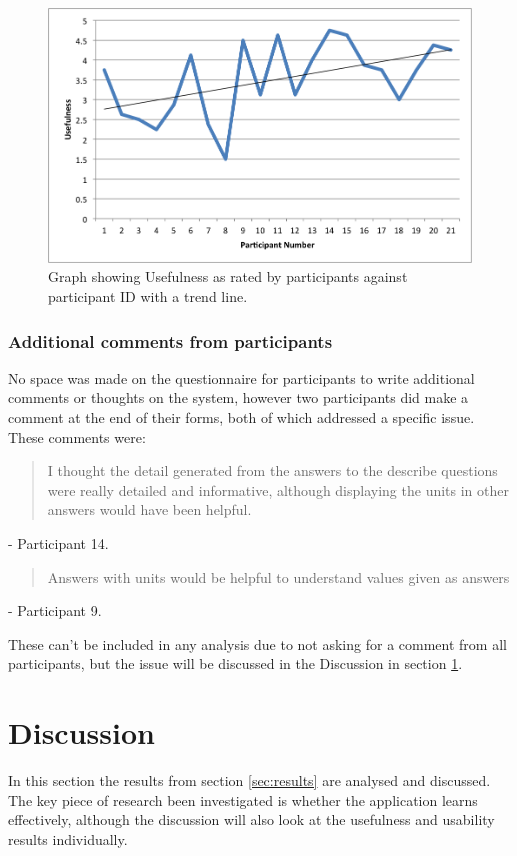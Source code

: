 \documentclass[authoryearcitations]{UoYCSproject}
\begin{document}
\begin{figure}[htb] 
\includegraphics[width=\linewidth]{usefulnessTrend}
\caption{Graph showing Usefulness as rated by participants against participant ID with a trend line.}
\label{fig:usefulnessTrend}
\end{figure}

\subsection{Additional comments from participants}
\label{subsec:resultsComments}

No space was made on the questionnaire for participants to write additional comments or thoughts on the system, however two participants did make a comment at the end of their forms, both of which addressed a specific issue. These comments were:

\blockquote{I thought the detail generated from the answers to the describe questions were really detailed and informative, although displaying the units in other answers would have been helpful.} - Participant 14.

\blockquote{Answers with units would be helpful to understand values given as answers} - Participant 9.

These can't be included in any analysis due to not asking for a comment from all participants, but the issue will be discussed in the Discussion in section \ref{sec:discussion}.

\newpage
\chapter{Discussion}
\label{sec:discussion}

In this section the results from section \ref{sec:results} are analysed and discussed. The key piece of research been investigated is whether the application learns effectively, although the discussion will also look at the usefulness and usability results individually.
\end{document}
